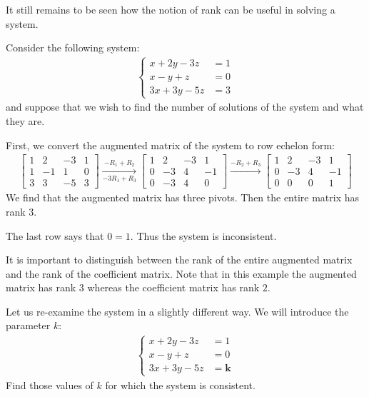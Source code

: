 \documentclass[11pt]{article}
\begin{document}
It still remains to be seen how the notion of rank can be useful in solving a system.

\vspace{1cm}

Consider the following system:
\begin{align*}
\left\{
\begin{aligned}
x + 2y - 3z &= 1
\\
x - y + z &= 0
\\
3x + 3y - 5z &= 3
\end{aligned}
\right.
\end{align*}
and suppose that we wish to find the number of solutions of the system and what they are.

First, we convert the augmented matrix of the system to row echelon form:
\begin{align*}
\left[
\begin{matrix}
1 & 2 & -3 & 1
\\
1 & -1 & 1 & 0
\\
3 & 3 & -5 & 3
\end{matrix}
\right]
\xrightarrow[-3R_1 + R_3]{-R_1 + R_2}
\left[
\begin{matrix}
1 & 2 & -3 & 1
\\
0 & -3 & 4 & -1
\\
0 & -3 & 4 & 0
\end{matrix}
\right]
\xrightarrow[]{-R_2 + R_3}
\left[
\begin{matrix}
1 & 2 & -3 & 1
\\
0 & -3 & 4 & -1
\\
0 & 0 & 0 & 1
\end{matrix}
\right]
\end{align*}
We find that the augmented matrix has three pivots. Then the entire matrix has rank $3$.

The last row says that $0=1$. Thus the system is inconsistent.

It is important to distinguish between the rank of the entire augmented matrix and the rank of the coefficient matrix. Note that in this example the augmented matrix has rank $3$ whereas the coefficient matrix has rank $2$.

Let us re-examine the system in a slightly different way. We will introduce the parameter $k$:
\begin{align*}
\left\{
\begin{aligned}
x + 2y - 3z &= 1
\\
x - y + z &= 0
\\
3x + 3y - 5z &= \mathbf{k}
\end{aligned}
\right.
\end{align*}
Find those values of $k$ for which the system is consistent.
\end{document}
